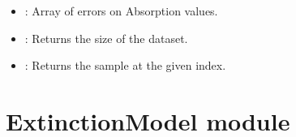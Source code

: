 \documentclass[letterpaper,10pt,english]{sphinxmanual}
\begin{document}
\begin{fulllineitems}
\begin{description}
\begin{itemize}
\item {} 
\sphinxAtStartPar
{}: Array of errors on Absorption values.

\end{itemize}

\begin{itemize}
\item {} 
\sphinxAtStartPar
{} : Returns the size of the dataset.

\item {} 
\sphinxAtStartPar
{}: Returns the sample at the given index.

\end{itemize}

\end{description}

\end{fulllineitems}


\sphinxstepscope


\section{ExtinctionModel module}
\label{\detokenize{ExtinctionModel:module-ExtinctionModel}}\label{\detokenize{ExtinctionModel:extinctionmodel-module}}\label{\detokenize{ExtinctionModel::doc}}
\end{document}
